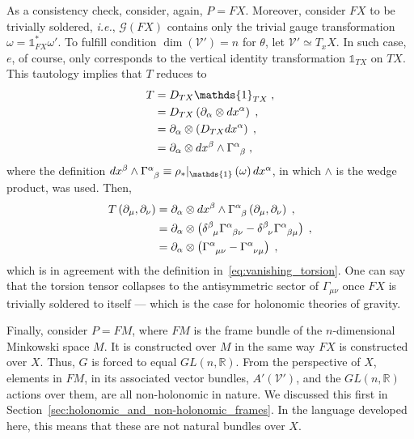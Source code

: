 \documentclass[../../main.tex]{subfiles}
\begin{document}
As a consistency check, consider, again, $P=FX$. Moreover, consider $FX$ to be trivially soldered, \textit{i.e.}, $\mathcal{G}\left(FX\right)$ contains only the trivial gauge transformation $\omega=\mathds{1}_{FX}^* \omega'$. To fulfill condition $\dim \left(\mathcal{V'}\right)=n$ for $\theta$, let $\mathcal{V}'\simeq T_x X$. In such case, $e$, of course, only corresponds to the vertical identity transformation $\mathds{1}_{TX}$ on $TX$. This tautology implies that $T$ reduces to
\begin{align}
  \label{}
  T & = D_{TX}\mathds{1}_{TX} \;, \nonumber                                       \\
    & = D_{TX}\left(\partial_\alpha\otimes dx^\alpha\right) \;, \nonumber         \\
    & = \partial_\alpha\otimes \left(D_{TX}dx^\alpha\right) \;, \nonumber         \\
    & = \partial_\alpha\otimes dx^\beta \wedge \tensor{\Gamma}{^\alpha_\beta} \;,
\end{align}
where the definition $dx^\beta \wedge \tensor{\Gamma}{^\alpha_\beta} \equiv \rho_*|_{\mathds{1}}\left(\omega\right) dx^\alpha$, in which $\wedge$ is the wedge product, was used. Then,
\begin{align}
  \label{eq:torsion_2form_trivial_solder}
  T\left(\partial_\mu,\partial_\nu\right) & = \partial_\alpha \otimes dx^\beta\wedge\tensor{\Gamma}{^\alpha_\beta} \left(\partial_\mu,\partial_\nu\right) \;,\nonumber                                                          \\
                                          & = \partial_\alpha \otimes \left(\tensor{\delta}{^\beta_\mu}\tensor{\Gamma}{^\alpha_{\beta\nu}} - \tensor{\delta}{^\beta_\nu}\tensor{\Gamma}{^\alpha_{\beta\mu}}\right) \;,\nonumber \\
                                          & = \partial_\alpha \otimes \left(\tensor{\Gamma}{^\alpha_{\mu\nu}} - \tensor{\Gamma}{^\alpha_{\nu\mu}}\right) \;,
\end{align}
which is in agreement with the definition in~\eqref{eq:vanishing_torsion}. One can say that the torsion tensor collapses to the antisymmetric sector of $\Gamma_{\mu\nu}$ once $FX$ is trivially soldered to itself --- which is the case for holonomic theories of gravity.

Finally, consider $ P=FM $, where $ FM $ is the frame bundle of the $ n $-dimensional Minkowski space $ M $. It is constructed over $M$ in the same way $FX$ is constructed over $X$. Thus, $G$ is forced to equal $GL\left(n,\mathbb{R}\right)$. From the perspective of $X$, elements in $FM$, in its associated vector bundles, $A'\left(\mathcal V'\right)$, and the $GL\left(n,\mathbb{R}\right)$ actions over them, are all non-holonomic in nature. We discussed this first in Section~\ref{sec:holonomic_and_non-holonomic_frames}. In the language developed here, this means that these are not natural bundles over $X$.
\end{document}
